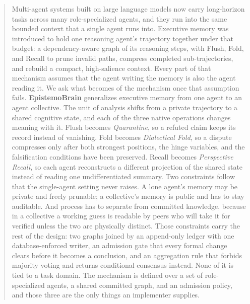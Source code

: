 \begin{abstract}

Multi-agent systems built on large language models now carry long-horizon
tasks across many role-specialized agents, and they run into the same bounded
context that a single agent runs into. Executive memory was introduced to hold
one reasoning agent's trajectory together under that budget: a
dependency-aware graph of its reasoning steps, with Flush, Fold, and Recall to
prune invalid paths, compress completed sub-trajectories, and rebuild a
compact, high-salience context. Every part of that mechanism assumes that the
agent writing the memory is also the agent reading it. We ask what becomes of
the mechanism once that assumption fails. \textbf{EpistemoBrain} generalizes
executive memory from one agent to an agent collective. The unit of analysis
shifts from a private trajectory to a shared cognitive state, and each of the
three native operations changes meaning with it. Flush becomes
\emph{Quarantine}, so a refuted claim keeps its record instead of vanishing.
Fold becomes \emph{Dialectical Fold}, so a dispute compresses only after both
strongest positions, the hinge variables, and the falsification conditions
have been preserved. Recall becomes \emph{Perspective Recall}, so each agent
reconstructs a different projection of the shared state instead of reading one
undifferentiated summary. Two constraints follow that the single-agent setting
never raises. A lone agent's memory may be private and freely prunable; a
collective's memory is public and has to stay auditable. And process has to
separate from committed knowledge, because in a collective a working guess is
readable by peers who will take it for verified unless the two are physically
distinct. Those constraints carry the rest of the design: two graphs joined by
an append-only ledger with one database-enforced writer, an admission gate that
every formal change clears before it becomes a conclusion, and an aggregation
rule that forbids majority voting and returns conditional consensus instead.
None of it is tied to a task domain. The mechanism is defined over a set of
role-specialized agents, a shared committed graph, and an admission policy,
and those three are the only things an implementer supplies.


\end{abstract}
